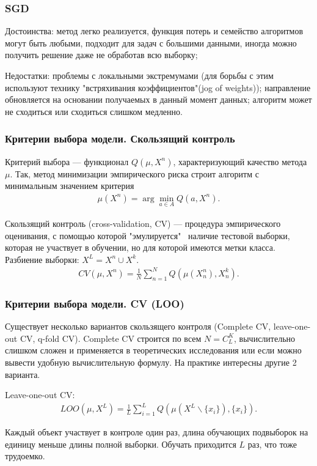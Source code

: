 \documentclass[11pt]{beamer}
\begin{document}
\begin{frame}
	\frametitle{SGD}
	Достоинства: метод легко реализуется, функция потерь и семейство
	алгоритмов могут быть любыми, подходит для задач с большими данными, иногда можно получить решение даже не обработав всю выборку;

	Недостатки: проблемы с локальными экстремумами (для борьбы с
	этим используют технику "встряхивания коэффициентов"(jog of weights));
	направление обновляется на основании получаемых в данный момент
	данных; алгоритм может не сходиться или сходиться слишком медленно.
\end{frame}

\begin{frame}
	\frametitle{Критерии выбора модели. Скользящий контроль}
	
		Критерий выбора --- функционал $Q(\mu, {X}^n)$, характеризующий качество метода $\mu$. Так, метод минимизации эмпирического риска строит алгоритм с минимальным значением критерия
	\begin{eqnarray}\label{Min_error_criterion}  
		\mu ({X}^n) = \arg \min _{{a \in A}} Q(a, {X}^n). 
	\end{eqnarray}
	
	Скользящий контроль (cross-validation, CV) --- процедура эмпирического оценивания, с помощью которой "эмулируется" \ наличие тестовой выборки, которая не участвует в обучении, но для которой имеются метки класса. Разбиение выборки: ${X}^L = {X}^n \cup {X}^k$. 
	\begin{eqnarray}\label{CV}  
		CV (\mu, {X}^n) =\frac{1}{N} \sum_{n = 1}^{N} Q (\mu(X_{n}^{n}), X_{n}^{k}). 
	\end{eqnarray}
	
	
\end{frame}


\begin{frame}
	\frametitle{Критерии выбора модели. CV (LOO)}
	
		Существует несколько вариантов скользящего контроля (Complete CV, leave-one-out CV, q-fold CV). Complete CV строится по всем $N = C_{L}^{K}$, вычислительно слишком сложен и применяется в теоретических исследования или если можно вывести удобную вычислительную формулу. На практике интересны другие 2 варианта. 

		Leave-one-out CV:
		\begin{eqnarray}\label{LOO}  
			LOO(\mu, X^L) =\frac{1}{L} \sum_{i = 1}^{L} Q (\mu(X^L \backslash \{x_i\}), \{x_i\}). 
		\end{eqnarray}
		
		Каждый объект участвует в контроле один раз, длина обучающих подвыборок на единицу меньше длины полной выборки. Обучать приходится $L$ раз, что тоже трудоемко.
	
\end{frame}
\end{document}
